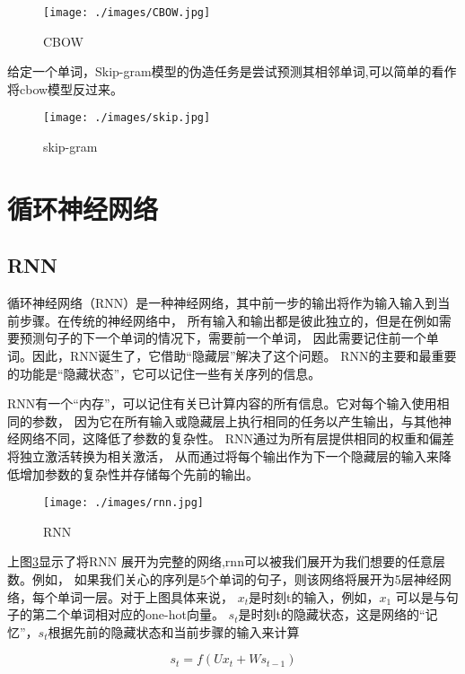 \begin{figure}[htbp]
  \centering
  \texttt{[image: ./images/CBOW.jpg]}
  \caption{CBOW}
  \label{fig:CBOW}
\end{figure}


给定一个单词，Skip-gram模型的伪造任务是尝试预测其相邻单词,可以简单的看作将cbow模型反过来。

\begin{figure}[htbp]
  \centering
  \texttt{[image: ./images/skip.jpg]}
  \caption{skip-gram}
  \label{fig:skip}
\end{figure}

\section{循环神经网络}

\subsection{RNN}

循环神经网络（RNN）是一种神经网络，其中前一步的输出将作为输入输入到当前步骤。在传统的神经网络中，
所有输入和输出都是彼此独立的，但是在例如需要预测句子的下一个单词的情况下，需要前一个单词，
因此需要记住前一个单词。因此，RNN诞生了，它借助“隐藏层”解决了这个问题。
RNN的主要和最重要的功能是“隐藏状态”，它可以记住一些有关序列的信息。

RNN有一个“内存”，可以记住有关已计算内容的所有信息。它对每个输入使用相同的参数，
因为它在所有输入或隐藏层上执行相同的任务以产生输出，与其他神经网络不同，这降低了参数的复杂性。
RNN通过为所有层提供相同的权重和偏差将独立激活转换为相关激活，
从而通过将每个输出作为下一个隐藏层的输入来降低增加参数的复杂性并存储每个先前的输出。

\begin{figure}[htbp]
  \centering
  \texttt{[image: ./images/rnn.jpg]}
  \caption{RNN}
  \label{fig:rnn}
\end{figure}

上图\ref{fig:rnn}显示了将RNN 展开为完整的网络,rnn可以被我们展开为我们想要的任意层数。例如，
如果我们关心的序列是5个单词的句子，则该网络将展开为5层神经网络，每个单词一层。对于上图具体来说，
$x_{t}$是时刻t的输入，例如，$x_{1}$ 可以是与句子的第二个单词相对应的one-hot向量。
$s_{t}$是时刻t的隐藏状态，这是网络的“记忆”，$s_{t}$根据先前的隐藏状态和当前步骤的输入来计算

\begin{equation}
  s_{t}=f(U x_{t}+W s_{t-1})
  \end{equation}

